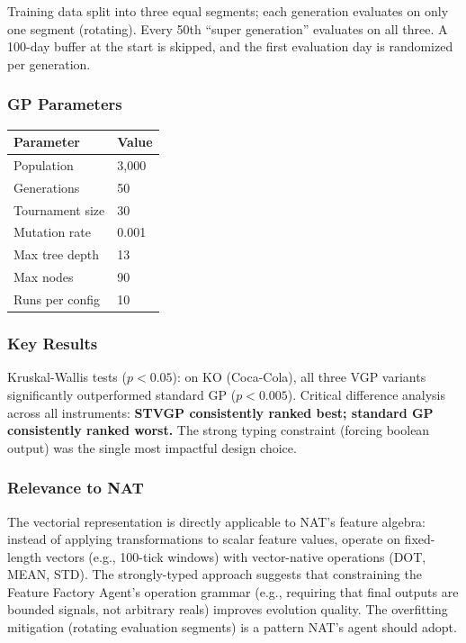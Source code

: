 \documentclass[11pt,a4paper]{article}
\begin{document}
Training data split into three equal segments; each generation evaluates on only one segment (rotating). Every 50th ``super generation'' evaluates on all three. A 100-day buffer at the start is skipped, and the first evaluation day is randomized per generation.

\subsubsection{GP Parameters}

\begin{center}
\begin{tabular}{l l}
\hline
\textbf{Parameter} & \textbf{Value} \\
\hline
Population & 3,000 \\
Generations & 50 \\
Tournament size & 30 \\
Mutation rate & 0.001 \\
Max tree depth & 13 \\
Max nodes & 90 \\
Runs per config & 10 \\
\hline
\end{tabular}
\end{center}

\subsubsection{Key Results}

Kruskal-Wallis tests ($p < 0.05$): on KO (Coca-Cola), all three VGP variants significantly outperformed standard GP ($p < 0.005$). Critical difference analysis across all instruments: \textbf{STVGP consistently ranked best; standard GP consistently ranked worst.} The strong typing constraint (forcing boolean output) was the single most impactful design choice.

\subsubsection{Relevance to NAT}

The vectorial representation is directly applicable to NAT's feature algebra: instead of applying transformations to scalar feature values, operate on fixed-length vectors (e.g., 100-tick windows) with vector-native operations (DOT, MEAN, STD). The strongly-typed approach suggests that constraining the Feature Factory Agent's operation grammar (e.g., requiring that final outputs are bounded signals, not arbitrary reals) improves evolution quality. The overfitting mitigation (rotating evaluation segments) is a pattern NAT's agent should adopt.
\end{document}
